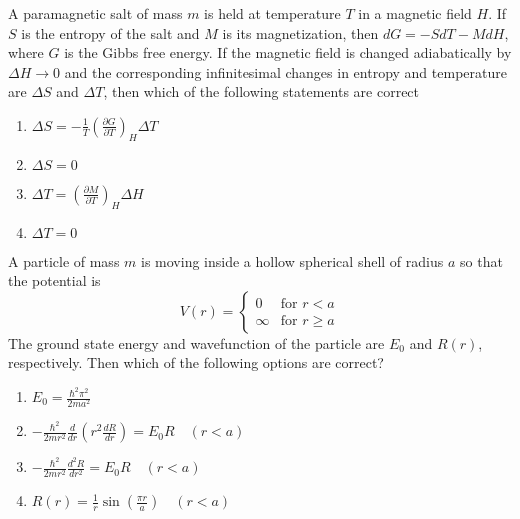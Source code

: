     \item A paramagnetic salt of mass $ m $ is held at temperature $ T $ in a magnetic field $ H $. If $ S $ is the entropy of the salt and $ M $ is its magnetization, then $ dG = -S dT - M dH $, where $ G $ is the Gibbs free energy. If the magnetic field is changed adiabatically by $ \Delta H \to 0 $ and the corresponding infinitesimal changes in entropy and temperature are $ \Delta S $ and $ \Delta T $, then which of the following statements are correct
    \begin{enumerate}
        \item $ \Delta S = - \frac{1}{T} \left( \frac{\partial G}{\partial T} \right)_{H} \Delta T $
        \item $ \Delta S = 0 $
        \item $ \Delta T = \left( \frac{\partial M}{\partial T} \right)_{H} \Delta H $
        \item $ \Delta T = 0 $
    \end{enumerate}

    \item A particle of mass $ m $ is moving inside a hollow spherical shell of radius $ a $ so that the potential is
    \[
    V(r) = 
    \begin{cases} 
      0 & \text{for } r < a \\
      \infty & \text{for } r \geq a 
    \end{cases}
    \]
    The ground state energy and wavefunction of the particle are $ E_0 $ and $ R(r) $, respectively. Then which of the following options are correct?
    \begin{enumerate}
        \item $ E_0 = \frac{\hbar^2 \pi^2}{2 m a^2} $
        \item $ -\frac{\hbar^2}{2 m r^2} \frac{d}{dr} \left( r^2 \frac{d R}{dr} \right) = E_0 R \quad (r < a) $
        \item $ -\frac{\hbar^2}{2 m r^2} \frac{d^2 R}{dr^2} = E_0 R \quad (r < a) $
        \item $ R(r) = \frac{1}{r} \sin \left( \frac{\pi r}{a} \right) \quad (r < a) $
    \end{enumerate}

